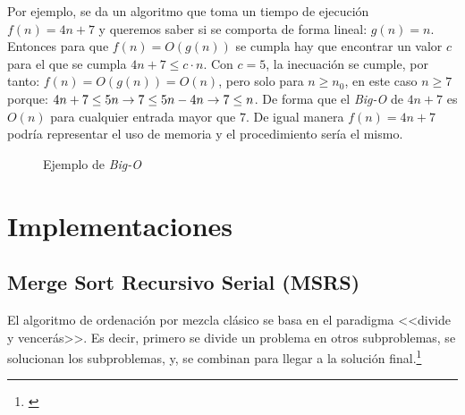 \documentclass[titlepage]{article}
\begin{document}
Por ejemplo, se da un algoritmo que toma un tiempo de ejecución \(f(n) = 4n+7\) y queremos saber si se comporta de forma lineal: \(g(n)=n\). Entonces para que \(f(n) = O(g(n))\) se cumpla hay que encontrar un valor \(c\) para el que se cumpla \(4n+7 \leq c\cdot n\). Con \(c=5\), la inecuación se cumple, por tanto: \(f(n) = O(g(n)) = O(n)\), pero solo para \(n \geq n_0\), en este caso \(n\geq 7\) porque: \(4n+7 \leq 5n \space \rightarrow 7 \leq 5n - 4n   \rightarrow 7 \leq n\). De forma que el \textit{Big-O} de \(4n+7\) es \(O(n)\) para cualquier entrada mayor que \(7\). De igual manera \(f(n) = 4n+7\) podría representar el uso de memoria y el procedimiento sería el mismo.

\begin{figure}[h]
	\captionsetup{justification=centering}
	\centering
	
	\caption{Ejemplo de \textit{Big-O}}
	\label{fig:bigO}
\end{figure}

\newpage
\section{Implementaciones} %

\subsection{Merge Sort Recursivo Serial (MSRS)} %
El algoritmo de ordenación por mezcla clásico se basa en el paradigma <<divide y vencerás>>. Es decir, primero se divide un problema en otros subproblemas, se solucionan los subproblemas, y, se combinan para llegar a la solución
final.\footnote{\cite{Sedgewick2003-cd}}
\end{document}
